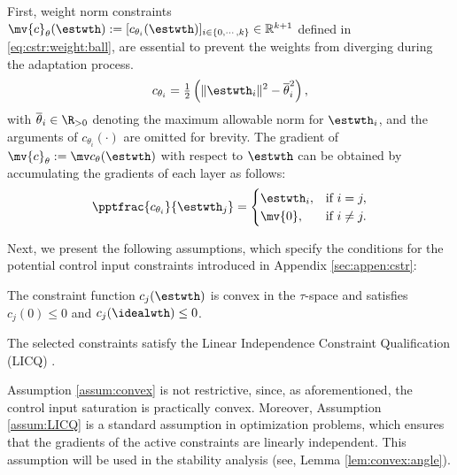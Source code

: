 \documentclass[journal]{IEEEtran}
\begin{document}
First, weight norm constraints $\mv{c}_{\theta}(\estwth):= [c_{\theta_i}(\estwth)]_{i\in\{0,\cdots ,k\}}\in\mathbb R^{k+1}$ defined in \eqref{eq:cstr:weight:ball}, are essential to prevent the weights from diverging during the adaptation process.
\begin{equation}
    c_{\theta_i}
    =
    \tfrac{1}{2}
    \left(
        \Vert \estwth_i\Vert^2 
        -
        \overline\theta_i^2 
    \right)    
    ,
    \label{eq:cstr:weight:ball}
\end{equation}
with $\overline\theta_i\in\R_{>0}$ denoting the maximum allowable norm for $\estwth_i$, and the arguments of $c_{\theta_i}(\cdot)$ are omitted for brevity.
The gradient of $\mv{c}_\theta:=\mv c_{\theta}(\estwth)$ with respect to $\estwth$ can be obtained by accumulating the gradients of each layer as follows:
\begin{equation}
    \pptfrac{c_{\theta_i}}{\estwth_j} 
    =
    \begin{cases}
        \estwth_i,
        &
        \text{if } i=j,
        \\
        \mv{0},
        &
        \text{if } i\ne j
        .
    \end{cases} 
    \label{eq:cstr:weight:ball:grad}
\end{equation}

Next, we present the following assumptions, which specify the conditions for the potential control input constraints introduced in Appendix \ref{sec:appen:cstr}:

\begin{assum}
    The constraint function $c_j(\estwth)$ is convex in the $\tau$-space and satisfies $c_j(0) \le 0$ and $c_j(\idealwth)\le 0$.
    \label{assum:convex}
\end{assum}

\begin{assum}
    The selected constraints satisfy the Linear Independence Constraint Qualification (LICQ) \cite[Chap.~12, Def.~12.1]{Nocedal:2006aa}.
    \label{assum:LICQ}
\end{assum}

\begin{remark}
    Assumption \ref{assum:convex} is not restrictive, since, as aforementioned, the control input saturation is practically convex.
    Moreover, Assumption \ref{assum:LICQ} is a standard assumption in optimization problems, which ensures that the gradients of the active constraints are linearly independent.
    This assumption will be used in the stability analysis (see, Lemma \ref{lem:convex:angle}).
\end{remark}
\end{document}
